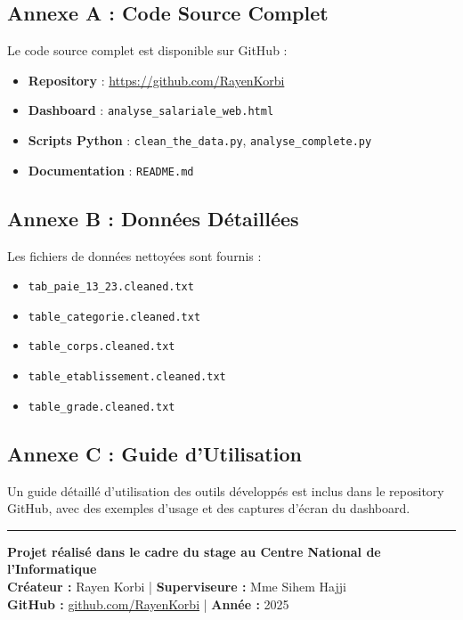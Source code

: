\documentclass[12pt,a4paper]{article}
\begin{document}
\subsection{Annexe A : Code Source Complet}
Le code source complet est disponible sur GitHub :
\begin{itemize}
    \item \textbf{Repository} : \href{https://github.com/RayenKorbi}{https://github.com/RayenKorbi}
    \item \textbf{Dashboard} : \texttt{analyse\_salariale\_web.html}
    \item \textbf{Scripts Python} : \texttt{clean\_the\_data.py}, \texttt{analyse\_complete.py}
    \item \textbf{Documentation} : \texttt{README.md}
\end{itemize}

\subsection{Annexe B : Données Détaillées}
Les fichiers de données nettoyées sont fournis :
\begin{itemize}
    \item \texttt{tab\_paie\_13\_23.cleaned.txt}
    \item \texttt{table\_categorie.cleaned.txt}
    \item \texttt{table\_corps.cleaned.txt}
    \item \texttt{table\_etablissement.cleaned.txt}
    \item \texttt{table\_grade.cleaned.txt}
\end{itemize}

\subsection{Annexe C : Guide d'Utilisation}
Un guide détaillé d'utilisation des outils développés est inclus dans le repository GitHub, avec des exemples d'usage et des captures d'écran du dashboard.

\vspace{2cm}

\hrule

\vspace{0.5cm}

\begin{center}
\textbf{Projet réalisé dans le cadre du stage au Centre National de l'Informatique}\\
\textbf{Créateur :} Rayen Korbi | \textbf{Superviseure :} Mme Sihem Hajji\\
\textbf{GitHub :} \href{https://github.com/RayenKorbi}{github.com/RayenKorbi} | \textbf{Année :} 2025
\end{center}
\end{document}
